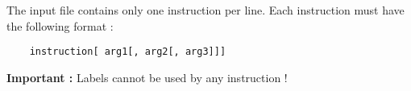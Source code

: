 The input file contains only one instruction per line. Each instruction must have the following format : 
\begin{verbatim}
	instruction[ arg1[, arg2[, arg3]]]
\end{verbatim}

\textbf{Important :} Labels cannot be used by any instruction !